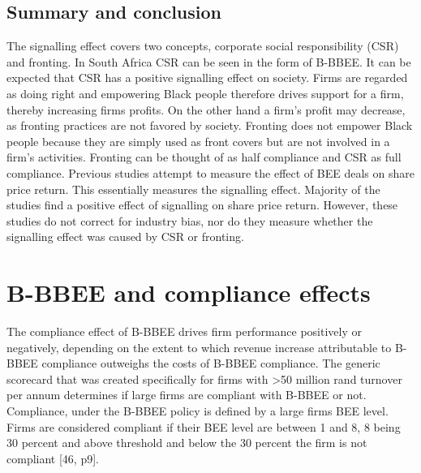 \subsection{Summary and conclusion}
The signalling effect covers two concepts, corporate social responsibility (CSR) and fronting. In South Africa CSR can be seen in the form of B-BBEE. It can be expected that CSR has a positive signalling effect on society. Firms are regarded as doing right and empowering Black people therefore drives support for a firm, thereby increasing firms profits. On the other hand a firm’s profit may decrease, as fronting practices are not favored by society. Fronting does not empower Black people because they are simply used as front covers but are not involved in a firm’s activities. Fronting can be thought of as half compliance and CSR as full compliance. Previous studies attempt to measure the effect of BEE deals on share price return. This essentially measures the signalling effect. Majority of the studies find a positive effect of signalling on share price return. However, these studies do not correct for industry bias, nor do they measure whether the signalling effect was caused by CSR or fronting.      
\section{B-BBEE and compliance effects}
The compliance effect of B-BBEE drives firm performance positively or negatively, depending on the extent to which revenue increase attributable to B-BBEE compliance outweighs the costs of B-BBEE compliance. The generic scorecard that was created specifically for firms with >50 million rand turnover per annum determines if large firms are compliant with B-BBEE or not. Compliance, under the B-BBEE policy is defined by a large firms BEE level. Firms are considered compliant if their BEE level are between 1 and 8, 8 being 30 percent and above threshold and below the 30 percent the firm is not compliant [46, p9].
